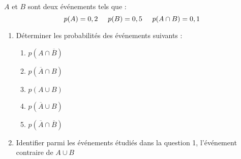 
$A$ et $B$ sont deux événements tels que :
$$ p(A)=0,2 \hspace{0,5cm} p(B)=0,5 \hspace{0,5cm} p(A \cap B) = 0,1$$

\begin{enumerate}
\item Déterminer les probabilités des événements suivants :

	\begin{enumerate}
	\item $p(A \cap \overline{B})$
	\item $p(\overline{A} \cap B)$
	\item $p(A \cup B)$
	\item $p(\overline{A} \cup B)$
	\item $p(\overline{A} \cap \overline{B})$
	\end{enumerate}

\item Identifier parmi les événements étudiés dans la question 1, l'événement contraire de $A \cup B$
\end{enumerate}
